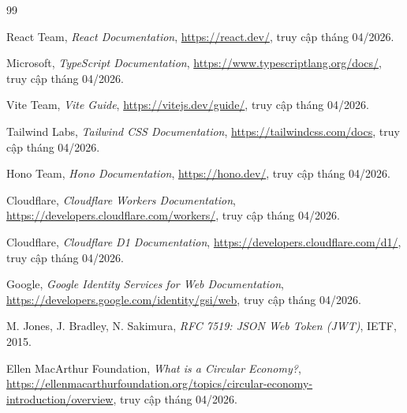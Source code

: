 \begin{thebibliography}{99}

React Team, \textit{React Documentation},\newline
\url{https://react.dev/}, truy cập tháng 04/2026.

Microsoft, \textit{TypeScript Documentation},\newline
\url{https://www.typescriptlang.org/docs/}, truy cập tháng 04/2026.

Vite Team, \textit{Vite Guide},\newline
\url{https://vitejs.dev/guide/}, truy cập tháng 04/2026.

Tailwind Labs, \textit{Tailwind CSS Documentation},\newline
\url{https://tailwindcss.com/docs}, truy cập tháng 04/2026.

Hono Team, \textit{Hono Documentation},\newline
\url{https://hono.dev/}, truy cập tháng 04/2026.

Cloudflare, \textit{Cloudflare Workers Documentation},\newline
\url{https://developers.cloudflare.com/workers/}, truy cập tháng 04/2026.

Cloudflare, \textit{Cloudflare D1 Documentation},\newline
\url{https://developers.cloudflare.com/d1/}, truy cập tháng 04/2026.

Google, \textit{Google Identity Services for Web Documentation},\newline
\url{https://developers.google.com/identity/gsi/web}, truy cập tháng 04/2026.

M. Jones, J. Bradley, N. Sakimura, \textit{RFC 7519: JSON Web Token (JWT)}, IETF, 2015.

Ellen MacArthur Foundation, \textit{What is a Circular Economy?},\newline
\url{https://ellenmacarthurfoundation.org/topics/circular-economy-introduction/overview}, truy cập tháng 04/2026.

\end{thebibliography}
